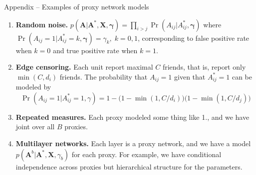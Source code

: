 \documentclass{beamer}
\def \bA {\textbf{A}}
\def \bX {\textbf{X}}
\def \bgamma {\boldsymbol{\gamma}}
\begin{document}
    \begin{frame}{Appendix -- Examples of proxy network models}
        \begin{enumerate}
            \item \textbf{Random noise.} $ p(\bA \vert \bA^\ast, \bX,\bgamma) =
            \prod_{i>j}\Pr(A_{ij} \vert A^\ast_{ij},\bgamma)$  where $\Pr(A_{ij}=1 \vert A^\ast_{ij}=k,\bgamma) = \gamma_k,\; k=0,1$, corresponding to false positive rate when $k=0$ and true positive rate when $k=1$. 
            \vspace{0.2cm}
            \item \textbf{Edge censoring.} Each unit report maximal $C$ friends, that is, report only
                    $\min(C,d_i)$ friends. The probability that $A_{ij}=1$ given that $A^\ast_{ij}=1$ can be modeled by
                    \begin{equation*}
                    \Pr(A_{ij}=1 \vert A^\ast_{ij}=1, \gamma) =
                    1 - \big(1- \min(1, C/d_i))(1- \min(1, C/d_j)\big)
                    \end{equation*}
            \vspace{0.2cm}
            \item \textbf{Repeated measures.} Each proxy modeled some thing like 1., and we have joint over all $B$ proxies.
            \vspace{0.2cm}
            \item \textbf{Multilayer networks.} Each layer is a proxy network, and we have a model $p(\bA^b \vert \bA^\ast,\bX,\gamma_b)$ for each proxy.
                        For example, we have conditional independence across proxies but hierarchical structure for the parameters.
        \end{enumerate}
    \end{frame}
\end{document}
